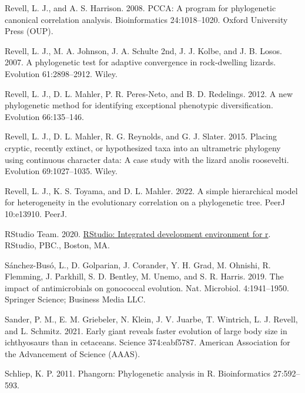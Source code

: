 \documentclass[fleqn,10pt,lineno]{wlpeerj} %
\newlength{\cslhangindent}
\newlength{\cslentryspacingunit} %
\newenvironment{CSLReferences}[2] %
 {%
  \setlength{\parindent}{0pt}
  \ifodd #1
  \let\oldpar\par
  \def\par{\hangindent=\cslhangindent\oldpar}
  \fi
  \setlength{\parskip}{#2\cslentryspacingunit}
 }%
 {}
\begin{document}
\begin{CSLReferences}{1}{0}
\leavevmode{}%
Revell, L. J., and A. S. Harrison. 2008. {PCCA}: A program for phylogenetic canonical correlation analysis. Bioinformatics 24:1018--1020. Oxford University Press (OUP).

\leavevmode{}%
Revell, L. J., M. A. Johnson, J. A. Schulte 2nd, J. J. Kolbe, and J. B. Losos. 2007. A phylogenetic test for adaptive convergence in rock-dwelling lizards. Evolution 61:2898--2912. Wiley.

\leavevmode{}%
Revell, L. J., D. L. Mahler, P. R. Peres-Neto, and B. D. Redelings. 2012. A new phylogenetic method for identifying exceptional phenotypic diversification. Evolution 66:135--146.

\leavevmode{}%
Revell, L. J., D. L. Mahler, R. G. Reynolds, and G. J. Slater. 2015. Placing cryptic, recently extinct, or hypothesized taxa into an ultrametric phylogeny using continuous character data: A case study with the lizard anolis roosevelti. Evolution 69:1027--1035. Wiley.

\leavevmode{}%
Revell, L. J., K. S. Toyama, and D. L. Mahler. 2022. A simple hierarchical model for heterogeneity in the evolutionary correlation on a phylogenetic tree. PeerJ 10:e13910. PeerJ.

\leavevmode{}%
RStudio Team. 2020. \href{http://www.rstudio.com/}{RStudio: Integrated development environment for r}. RStudio, PBC., Boston, MA.

\leavevmode{}%
Sánchez-Busó, L., D. Golparian, J. Corander, Y. H. Grad, M. Ohnishi, R. Flemming, J. Parkhill, S. D. Bentley, M. Unemo, and S. R. Harris. 2019. The impact of antimicrobials on gonococcal evolution. Nat. Microbiol. 4:1941--1950. Springer Science; Business Media LLC.

\leavevmode{}%
Sander, P. M., E. M. Griebeler, N. Klein, J. V. Juarbe, T. Wintrich, L. J. Revell, and L. Schmitz. 2021. Early giant reveals faster evolution of large body size in ichthyosaurs than in cetaceans. Science 374:eabf5787. American Association for the Advancement of Science (AAAS).

\leavevmode{}%
Schliep, K. P. 2011. Phangorn: Phylogenetic analysis in {R}. Bioinformatics 27:592--593.


\end{CSLReferences}
\end{document}
